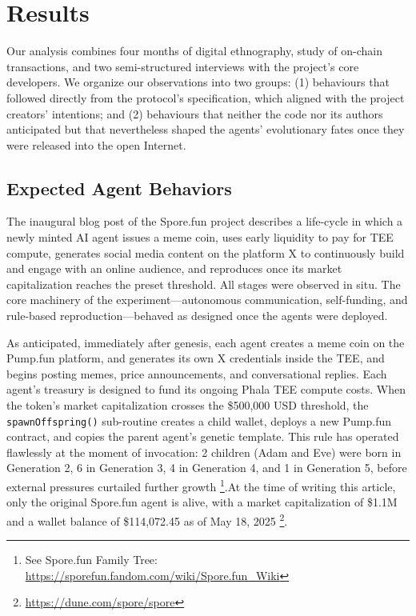 \section{Results}



Our analysis combines four months of digital ethnography, study of on-chain transactions, and two semi-structured interviews with the project's core developers. We organize our observations into two groups: (1) behaviours that followed directly from the protocol's specification, which aligned with the project creators' intentions; and (2) behaviours that neither the code nor its authors anticipated but that nevertheless shaped the agents' evolutionary fates once they were released into the open Internet. 

\subsection{Expected Agent Behaviors}


The inaugural blog post of the Spore.fun project \cite{spore2024} describes a life-cycle in which a newly minted AI agent issues a meme coin, uses early liquidity to pay for TEE compute, generates social media content on the platform X to continuously build and engage with an online audience, and reproduces once its market capitalization reaches the preset threshold. All stages were observed in situ. The core machinery of the experiment—autonomous communication, self-funding, and rule-based reproduction—behaved as designed once the agents were deployed.

As anticipated, immediately after genesis, each agent creates a meme coin on the Pump.fun platform, and generates its own X credentials inside the TEE, and begins posting memes, price announcements, and conversational replies. Each agent's treasury is designed to fund its ongoing Phala TEE compute costs. When the token's market capitalization crosses the \$500,000 USD threshold, the \texttt{spawnOffspring()} sub-routine creates a child wallet, deploys a new Pump.fun contract, and copies the parent agent's genetic template. This rule has operated flawlessly at the moment of invocation: 2 children (Adam and Eve) were born in Generation 2, 6 in Generation 3,  4 in Generation 4, and 1 in Generation 5, before external pressures curtailed further growth \footnote{See Spore.fun Family Tree: \url{https://sporefun.fandom.com/wiki/Spore.fun_Wiki}}.At the time of writing this article, only the original Spore.fun agent is alive, with a market capitalization of \$1.1M and a wallet balance of \$114,072.45 as of May 18, 2025 \footnote{\url{https://dune.com/spore/spore}}. 

